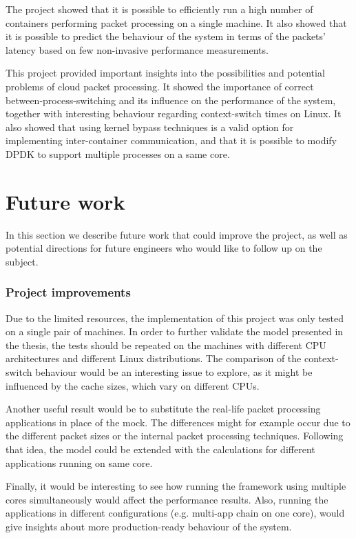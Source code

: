 \documentclass[english]{kththesis}
\begin{document}
The project showed that it is possible to efficiently run a high number of containers performing packet processing on a single machine. It also showed that it is possible to predict the behaviour of the system in terms of the packets' latency based on few non-invasive performance measurements.

This project provided important insights into the possibilities and potential problems of cloud packet processing. It showed the importance of correct between-process-switching and its influence on the performance of the system, together with interesting behaviour regarding context-switch times on Linux. It also showed that using kernel bypass techniques is a valid option for implementing inter-container communication, and that it is possible to modify DPDK to support multiple processes on a same core.

\section{Future work}
\label{sec:futureWork}

In this section we describe future work that could improve the project, as well as potential directions for future engineers who would like to follow up on the subject.

\subsubsection{Project improvements}

Due to the limited resources, the implementation of this project was only tested on a single pair of machines. In order to further validate the model presented in the thesis, the tests should be repeated on the machines with different CPU architectures and different Linux distributions. The comparison of the context-switch behaviour would be an interesting issue to explore, as it might be influenced by the cache sizes, which vary on different CPUs.

Another useful result would be to substitute the real-life packet processing applications in place of the mock. The differences might for example occur due to the different packet sizes or the internal packet processing techniques. Following that idea, the model could be extended with the calculations for different applications running on same core.

Finally, it would be interesting to see how running the framework using multiple cores simultaneously would affect the performance results. Also, running the applications in different configurations (e.g. multi-app chain on one core), would give insights about more production-ready behaviour of the system.
\end{document}
